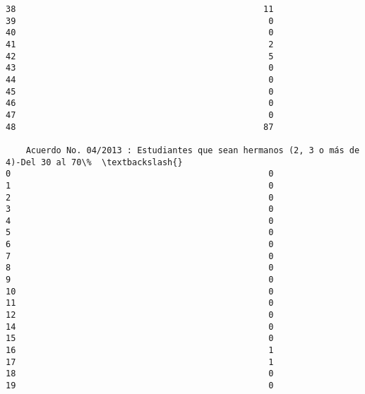 \documentclass[11pt]{article}
\begin{document}
\begin{Verbatim}[commandchars=\\\{\}]
38                                                 11               
39                                                  0               
40                                                  0               
41                                                  2               
42                                                  5               
43                                                  0               
44                                                  0               
45                                                  0               
46                                                  0               
47                                                  0               
48                                                 87               

    Acuerdo No. 04/2013 : Estudiantes que sean hermanos (2, 3 o más de 4)-Del 30 al 70\%  \textbackslash{}
0                                                   0                                     
1                                                   0                                     
2                                                   0                                     
3                                                   0                                     
4                                                   0                                     
5                                                   0                                     
6                                                   0                                     
7                                                   0                                     
8                                                   0                                     
9                                                   0                                     
10                                                  0                                     
11                                                  0                                     
12                                                  0                                     
14                                                  0                                     
15                                                  0                                     
16                                                  1                                     
17                                                  1                                     
18                                                  0                                     
19                                                  0                                     

\end{Verbatim}
\end{document}
